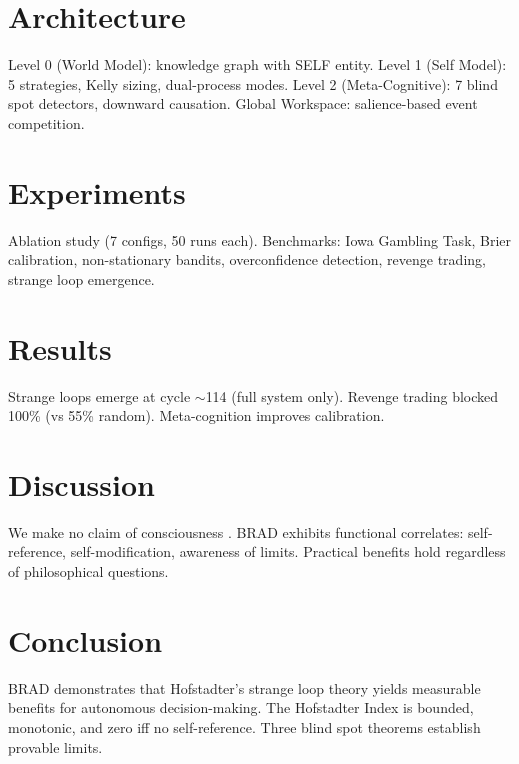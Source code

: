 \documentclass[11pt]{article}
\begin{document}
\section{Architecture}
\label{sec:architecture}

Level 0 (World Model): knowledge graph with SELF entity. Level 1 (Self Model): 5 strategies, Kelly sizing, dual-process modes. Level 2 (Meta-Cognitive): 7 blind spot detectors, downward causation. Global Workspace: salience-based event competition.

\section{Experiments}
\label{sec:experiments}

Ablation study (7 configs, 50 runs each). Benchmarks: Iowa Gambling Task, Brier calibration, non-stationary bandits, overconfidence detection, revenge trading, strange loop emergence.

\section{Results}
\label{sec:results}

Strange loops emerge at cycle $\sim$114 (full system only). Revenge trading blocked 100\% (vs 55\% random). Meta-cognition improves calibration.

\section{Discussion}

We make no claim of consciousness \citep{chalmers1995hard}. BRAD exhibits functional correlates: self-reference, self-modification, awareness of limits. Practical benefits hold regardless of philosophical questions.

\section{Conclusion}

BRAD demonstrates that Hofstadter's strange loop theory yields measurable benefits for autonomous decision-making. The Hofstadter Index is bounded, monotonic, and zero iff no self-reference. Three blind spot theorems establish provable limits.



\end{document}

